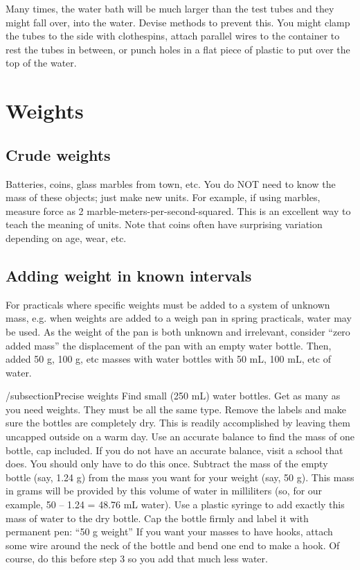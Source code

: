 Many times, 
the water bath will be much larger than the test tubes 
and they might fall over, 
into the water. 
Devise methods to prevent this. 
You might clamp the tubes to the side with clothespins, 
attach parallel wires to the container to rest the tubes in between, 
or punch holes in a flat piece of plastic to put over the top of the water.

\section{Weights}

\subsection{Crude weights}
Batteries, 
coins, 
glass marbles from town, 
etc. 
You do NOT need to know the mass of these objects; just make new units. 
For example, 
if using marbles, 
measure force as 2 marble-meters-per-second-squared. 
This is an excellent way to teach the meaning of units. 
Note that coins often have surprising variation depending on age, 
wear, 
etc.

\subsection{Adding weight in known intervals}
For practicals where specific weights must be added 
to a system of unknown mass, 
e.g. 
when weights are added to a weigh pan in spring practicals, 
water may be used. 
As the weight of the pan is both unknown and irrelevant, 
consider “zero added mass” the displacement of the pan with an empty water bottle. 
Then, 
added 50 g, 
100 g, 
etc masses with water bottles with 50 mL, 
100  mL, 
etc of water.

/subsection{Precise weights}
Find small (250 mL) water bottles. 
Get as many as you need weights. 
They must be all the same type.
Remove the labels and make sure the bottles are completely dry. 
This is readily accomplished 
by leaving them uncapped outside on a warm day.
Use an accurate balance to find the mass of one bottle, 
cap included. 
If you do not have an accurate balance, 
visit a school that does. 
You should only have to do this once.
Subtract the mass of the empty bottle (say, 
1.24 g) from the mass you want for your weight (say, 
50 g). 
This mass in grams will be provided 
by this volume of water in milliliters (so, 
for our example, 
50 – 1.24 = 48.76 mL water). 
Use a plastic syringe to add exactly this mass of water to the dry bottle.
Cap the bottle firmly and label it with permanent pen: “50 g weight” 
If you want your masses to have hooks, 
attach some wire around the neck of the bottle 
and bend one end to make a hook. 
Of course, 
do this before step 3 so you add that much less water.

